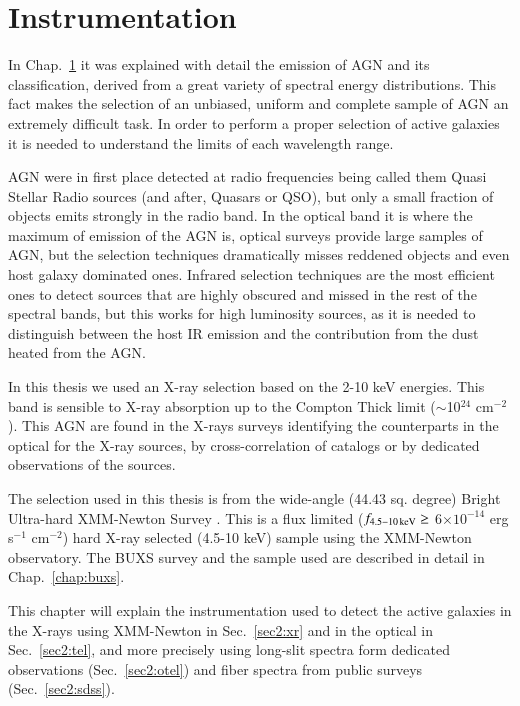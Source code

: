 \chapter{Instrumentation} %
\label{chap:ins}

In Chap.~\ref{chap:ins} it was explained with detail the emission of AGN and its classification, derived from a great variety of spectral energy distributions. This fact makes the selection of an unbiased, uniform and complete sample of AGN an extremely difficult task. In order to perform a proper selection of active galaxies it is needed to understand the limits of each wavelength range.  

AGN were in first place detected at radio frequencies being called them Quasi Stellar Radio sources (and after, Quasars or QSO), but only a small fraction of objects emits strongly in the radio band. In the optical band it is where the maximum of emission of the AGN is, optical surveys provide large samples of AGN, but the selection techniques dramatically misses reddened objects and even host galaxy dominated ones. Infrared selection techniques are the most efficient ones to detect sources that are highly obscured and missed in the rest of the spectral bands, but this works for high luminosity sources, as it is needed to distinguish between the host IR emission and the contribution from the dust heated from the AGN.

In this thesis we used an X-ray selection based on the 2-10 keV energies. This band is sensible to X-ray absorption up to the Compton Thick limit (\NH $\sim$10$^{24}$ cm$^{-2}$). This AGN are found in the X-rays surveys identifying the counterparts in the optical for the X-ray sources, by cross-correlation of catalogs or by dedicated observations of the sources.

The selection used in this thesis is from the wide-angle (44.43 sq. degree) Bright Ultra-hard XMM-Newton Survey \citep{mateos12}. This is a flux limited ($f_{\rm 4.5-10\,keV}\geq$ 6$\times 10^{-14}$ erg s$^{-1}$ cm$^{-2}$) hard X-ray selected (4.5-10 keV) sample using the XMM-Newton observatory. The BUXS survey and the sample used are described in detail in Chap.~\ref{chap:buxs}.

This chapter will explain the instrumentation used to detect the active galaxies in the X-rays using XMM-Newton in Sec.~\ref{sec2:xr} and in the optical in Sec.~\ref{sec2:tel}, and more precisely using long-slit spectra form dedicated observations (Sec.~\ref{sec2:otel}) and fiber spectra from public surveys (Sec.~\ref{sec2:sdss}).

